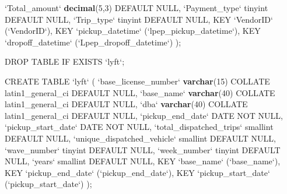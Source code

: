 \documentclass[12pt,twoside]{reedthesis}
\newenvironment{Shaded}{\begin{snugshade}}{\end{snugshade}}
\newcommand{\KeywordTok}[1]{\textcolor[rgb]{0.13,0.29,0.53}{\textbf{#1}}}
\newcommand{\DataTypeTok}[1]{\textcolor[rgb]{0.13,0.29,0.53}{#1}}
\newcommand{\DecValTok}[1]{\textcolor[rgb]{0.00,0.00,0.81}{#1}}
\newcommand{\StringTok}[1]{\textcolor[rgb]{0.31,0.60,0.02}{#1}}
\newcommand{\OtherTok}[1]{\textcolor[rgb]{0.56,0.35,0.01}{#1}}
\newcommand{\NormalTok}[1]{#1}
\theoremstyle{definition}
\theoremstyle{definition}
\theoremstyle{definition}
\theoremstyle{remark}
\begin{document}
\begin{Shaded}
\begin{Highlighting}[]
 \StringTok{`}\DataTypeTok{Total_amount}\StringTok{`} \KeywordTok{decimal}\NormalTok{(}\DecValTok{5}\NormalTok{,}\DecValTok{3}\NormalTok{) DEFAULT }\OtherTok{NULL}\NormalTok{,}
 \StringTok{`}\DataTypeTok{Payment_type}\StringTok{`}\NormalTok{ tinyint DEFAULT }\OtherTok{NULL}\NormalTok{,}
 \StringTok{`}\DataTypeTok{Trip_type}\StringTok{`}\NormalTok{ tinyint DEFAULT }\OtherTok{NULL}\NormalTok{,}
\NormalTok{ KEY }\StringTok{`}\DataTypeTok{VendorID}\StringTok{`}\NormalTok{ (}\StringTok{`}\DataTypeTok{VendorID}\StringTok{`}\NormalTok{),}
\NormalTok{ KEY }\StringTok{`}\DataTypeTok{pickup_datetime}\StringTok{`}\NormalTok{ (}\StringTok{`}\DataTypeTok{lpep_pickup_datetime}\StringTok{`}\NormalTok{),}
\NormalTok{ KEY }\StringTok{`}\DataTypeTok{dropoff_datetime}\StringTok{`}\NormalTok{ (}\StringTok{`}\DataTypeTok{Lpep_dropoff_datetime}\StringTok{`}\NormalTok{)}
\NormalTok{);}


\NormalTok{DROP TABLE IF EXISTS }\StringTok{`}\DataTypeTok{lyft}\StringTok{`}\NormalTok{;}

\NormalTok{CREATE TABLE }\StringTok{`}\DataTypeTok{lyft}\StringTok{`}\NormalTok{ (}
 \StringTok{`}\DataTypeTok{base_license_number}\StringTok{`} \KeywordTok{varchar}\NormalTok{(}\DecValTok{15}\NormalTok{) COLLATE latin1_general_ci DEFAULT }\OtherTok{NULL}\NormalTok{,}
 \StringTok{`}\DataTypeTok{base_name}\StringTok{`} \KeywordTok{varchar}\NormalTok{(}\DecValTok{40}\NormalTok{) COLLATE latin1_general_ci DEFAULT }\OtherTok{NULL}\NormalTok{,}
 \StringTok{`}\DataTypeTok{dba}\StringTok{`} \KeywordTok{varchar}\NormalTok{(}\DecValTok{40}\NormalTok{) COLLATE latin1_general_ci DEFAULT }\OtherTok{NULL}\NormalTok{,}
 \StringTok{`}\DataTypeTok{pickup_end_date}\StringTok{`}\NormalTok{ DATE NOT }\OtherTok{NULL}\NormalTok{,}
 \StringTok{`}\DataTypeTok{pickup_start_date}\StringTok{`}\NormalTok{ DATE NOT }\OtherTok{NULL}\NormalTok{,}
 \StringTok{`}\DataTypeTok{total_dispatched_trips}\StringTok{`}\NormalTok{ smallint DEFAULT }\OtherTok{NULL}\NormalTok{,}
 \StringTok{`}\DataTypeTok{unique_dispatched_vehicle}\StringTok{`}\NormalTok{ smallint DEFAULT }\OtherTok{NULL}\NormalTok{,}
 \StringTok{`}\DataTypeTok{wave_number}\StringTok{`}\NormalTok{ tinyint DEFAULT }\OtherTok{NULL}\NormalTok{,}
 \StringTok{`}\DataTypeTok{week_number}\StringTok{`}\NormalTok{ tinyint DEFAULT }\OtherTok{NULL}\NormalTok{,}
 \StringTok{`}\DataTypeTok{years}\StringTok{`}\NormalTok{ smallint DEFAULT }\OtherTok{NULL}\NormalTok{,}
\NormalTok{ KEY }\StringTok{`}\DataTypeTok{base_name}\StringTok{`}\NormalTok{ (}\StringTok{`}\DataTypeTok{base_name}\StringTok{`}\NormalTok{),}
\NormalTok{ KEY }\StringTok{`}\DataTypeTok{pickup_end_date}\StringTok{`}\NormalTok{ (}\StringTok{`}\DataTypeTok{pickup_end_date}\StringTok{`}\NormalTok{),}
\NormalTok{ KEY }\StringTok{`}\DataTypeTok{pickup_start_date}\StringTok{`}\NormalTok{ (}\StringTok{`}\DataTypeTok{pickup_start_date}\StringTok{`}\NormalTok{)}
\NormalTok{);}



\end{Highlighting}
\end{Shaded}
\end{document}
